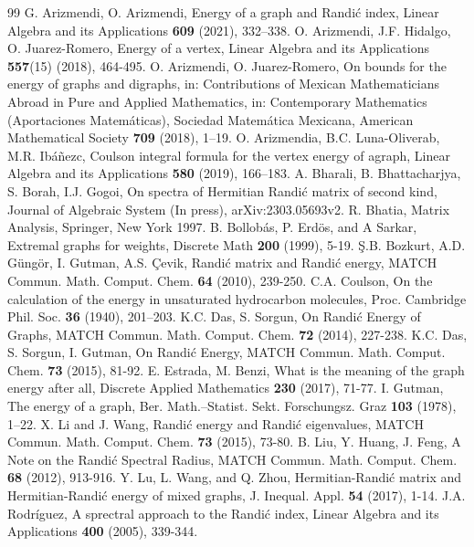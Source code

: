 \documentclass[10 pt]{article}
\numberwithin{equation}{section}
\begin{document}
\begin{thebibliography}{99}
G. Arizmendi, O. Arizmendi, Energy of a graph and Randi\'c index, Linear Algebra and its Applications \textbf{609} (2021), 332–338.
O. Arizmendi, J.F. Hidalgo, O. Juarez-Romero, Energy of a vertex, Linear Algebra and its Applications \textbf{557}(15) (2018), 464-495.
O. Arizmendi, O. Juarez-Romero, On bounds for the energy of graphs and digraphs, in: Contributions of Mexican Mathematicians Abroad in Pure and Applied Mathematics, in: Contemporary Mathematics (Aportaciones Matemáticas), Sociedad Matemática Mexicana, American Mathematical Society \textbf{709} (2018), 1–19.
O. Arizmendia, B.C. Luna-Oliverab, M.R. Ib\'{a}\~{n}ezc, Coulson integral formula for the vertex energy of agraph, Linear Algebra and its Applications \textbf{580} (2019), 166–183.
A. Bharali, B. Bhattacharjya, S. Borah, I.J. Gogoi, On spectra of Hermitian Randi\'c matrix of second kind, Journal of Algebraic System (In press), arXiv:2303.05693v2.
 R. Bhatia, Matrix Analysis, Springer, New York 1997.
 B. Bollob\'as, P. Erd\"os, and A Sarkar, Extremal graphs for weights, Discrete Math \textbf{200} (1999), 5-19.
\c{S}.B. Bozkurt, A.D. G\"{u}ng\"or, I. Gutman, A.S. \c{C}evik, Randi\'c matrix and Randi\'c energy, MATCH Commun. Math. Comput. Chem. \textbf{64} (2010), 239-250.
C.A. Coulson, On the calculation of the energy in unsaturated hydrocarbon molecules, Proc. Cambridge Phil. Soc. \textbf{36} (1940), 201–203.
K.C. Das, S. Sorgun, On Randi\'c Energy of Graphs, MATCH Commun. Math. Comput. Chem. \textbf{72} (2014), 227-238.
K.C. Das, S. Sorgun, I. Gutman, On Randi\'c Energy, MATCH Commun. Math. Comput. Chem. \textbf{73} (2015), 81-92.
E. Estrada, M. Benzi, What is the meaning of the graph energy after all, Discrete Applied Mathematics \textbf{230} (2017), 71-77.
I. Gutman, The energy of a graph, Ber. Math.–Statist. Sekt. Forschungsz. Graz \textbf{103} (1978), 1–22.
X. Li and J. Wang, Randi\'c energy and Randi\'c eigenvalues, MATCH Commun. Math. Comput. Chem. \textbf{73} (2015), 73-80.
B. Liu, Y. Huang, J. Feng, A Note on the Randi\'c Spectral Radius, MATCH Commun. Math. Comput. Chem. \textbf{68} (2012), 913-916.
Y. Lu, L. Wang, and Q. Zhou, Hermitian-Randi\'c matrix and Hermitian-Randi\'c energy of mixed graphs, J. Inequal. Appl. \textbf{54} (2017), 1-14.
J.A. Rodr\'{i}guez, A sprectral approach to the Randić index, Linear Algebra and its Applications \textbf{400} (2005), 339-344.
\end{thebibliography}
\end{document}
